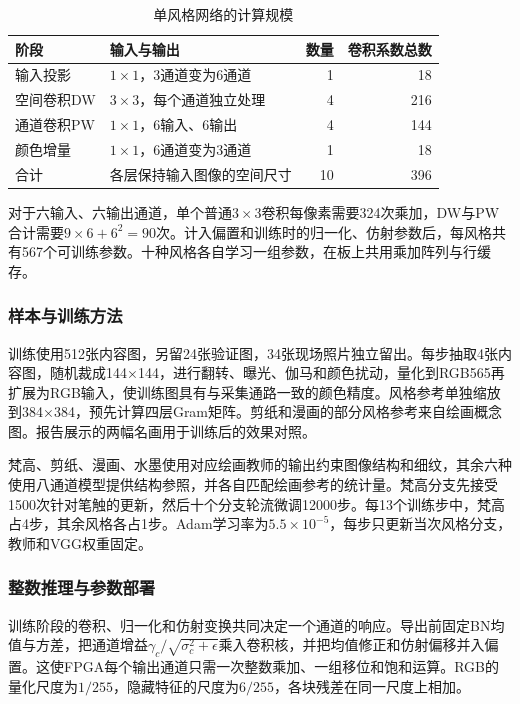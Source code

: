 \begin{table}[H]\centering\small
\caption{单风格网络的计算规模}\label{tab:layercost}
\begin{tabularx}{\linewidth}{@{}p{.24\linewidth}Xrr@{}}\toprule
阶段 & 输入与输出 & 数量 & 卷积系数总数\\\midrule
输入投影 & $1\times1$，3通道变为6通道 & 1 &18\\
空间卷积DW & $3\times3$，每个通道独立处理 & 4 &216\\
通道卷积PW & $1\times1$，6输入、6输出 & 4 &144\\
颜色增量 & $1\times1$，6通道变为3通道 & 1 &18\\\midrule
合计 & 各层保持输入图像的空间尺寸 &10&396\\\bottomrule
\end{tabularx}
\end{table}
对于六输入、六输出通道，单个普通$3\times3$卷积每像素需要324次乘加，DW与PW合计需要$9\times6+6^2=90$次\cite{mobilenet}。计入偏置和训练时的归一化、仿射参数后，每风格共有567个可训练参数。十种风格各自学习一组参数，在板上共用乘加阵列与行缓存。

\subsubsection{样本与训练方法}
训练使用512张内容图，另留24张验证图，34张现场照片独立留出。每步抽取4张内容图，随机裁成144×144，进行翻转、曝光、伽马和颜色扰动，量化到RGB565再扩展为RGB输入，使训练图具有与采集通路一致的颜色精度。风格参考单独缩放到384×384，预先计算四层Gram矩阵。剪纸和漫画的部分风格参考来自绘画概念图。报告展示的两幅名画用于训练后的效果对照。

梵高、剪纸、漫画、水墨使用对应绘画教师的输出约束图像结构和细纹，其余六种使用八通道模型提供结构参照，并各自匹配绘画参考的统计量。梵高分支先接受1500次针对笔触的更新，然后十个分支轮流微调12000步。每13个训练步中，梵高占4步，其余风格各占1步。Adam学习率为$5.5\times10^{-5}$，每步只更新当次风格分支，教师和VGG权重固定。

\subsubsection{整数推理与参数部署}
训练阶段的卷积、归一化和仿射变换共同决定一个通道的响应。导出前固定BN均值与方差，把通道增益$\gamma_c/\sqrt{\sigma_c^2+\epsilon}$乘入卷积核，并把均值修正和仿射偏移并入偏置。这使FPGA每个输出通道只需一次整数乘加、一组移位和饱和运算。RGB的量化尺度为$1/255$，隐藏特征的尺度为$6/255$，各块残差在同一尺度上相加。


